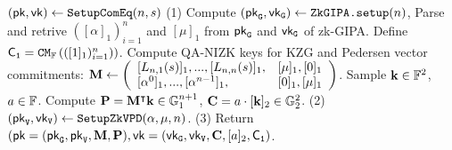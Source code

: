 \begin{footnotesize}
\begin{algorithm}[bt]
$ (\mathsf{pk},\mathsf{vk}) \leftarrow {\texttt{SetupComEq}}(n, s)$
\newline
(1) Compute $(\mathsf{pk}_{{\tt G}}, \mathsf{vk}_{{\tt G}}) 
	\leftarrow {\texttt{ZkGIPA.\texttt setup}}(n)$,
	Parse and retrive $([\alpha]_1)_{i=1}^n$ and $[\mu]_1$
	from $\mathsf{pk}_{{\tt G}}$ and $\mathsf{vk}_{{\tt G}}$ of zk-GIPA.
	Define ${\mathsf{C}}_{{\tt 1}} = {\mathtt{CM}}_{\mathbb{F}}\left(\left([1]_1)_{i=1}^n\right)\right)$.\newline
	Compute QA-NIZK keys for KZG and Pedersen vector commitments:
	\newline
    ${{\mathbf {M}}} \leftarrow \left(\begin{array}{l l}
		{[}L_{n,1}(s)]_1, ..., [L_{n,n}(s)]_1, & [\mu]_1, [0]_1 \\
		{[}\alpha^0]_1, ..., [\alpha^{n-1}]_1, & [0]_1, [\mu]_1 
		\end{array}
	\right)$. \newline
	Sample ${{\mathbf {k}}} \in \mathbb{F}^2$, $a\in \mathbb{F}$. Compute
	${{\mathbf {P}}} = {{\mathbf {M}}}^\intercal {{\mathbf {k}}} \in {\mathbb{G}}_1^{n+1}$,
	${{\mathbf {C}}} = a \cdot [{{\mathbf {k}}}]_2 \in {\mathbb{G}}_2^2$. \newline
(2) $(\mathsf{pk}_{{\tt V}}, \mathsf{vk}_{{\tt V}}) \leftarrow
		{\texttt{SetupZkVPD}}(\alpha, \mu, n)$. \newline
(3) Return $(\mathsf{pk}=(\mathsf{pk}_{{\tt G}}, \mathsf{pk}_{{\tt V}}, {{\mathbf {M}}}, {{\mathbf {P}}}), 
	\mathsf{vk}=(\mathsf{vk}_{{\tt G}}, \mathsf{vk}_{{\tt V}}, {{\mathbf {C}}}, [a]_2, {\mathsf{C}}_{{\tt 1}})$. \newline


\end{algorithm}
\end{footnotesize}
